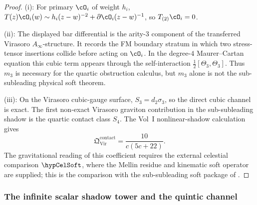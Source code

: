 \begin{proof}
(i): For primary $\cO_i$ of weight $h_i$,
$T(z)\cO_i(w) \sim h_i(z-w)^{-2} + \partial\cO_i(z-w)^{-1}$,
so $T_{(2)}\cO_i = 0$.

(ii): The displayed bar differential is the arity-$3$ component of
the transferred Virasoro \(A_\infty\)-structure.  It records the
FM boundary stratum in which two stress-tensor insertions collide
before acting on \(\cO_i\).  In the degree-$4$ Maurer--Cartan
equation this cubic term appears through the self-interaction
\(\frac12[\Theta_3,\Theta_3]\).  Thus \(m_3\) is necessary for the
quartic obstruction calculus, but \(m_3\) alone is not the
sub-subleading physical soft theorem.

(iii): On the Virasoro cubic-gauge surface,
\(S_3=d_2\sigma_3\), so the direct cubic channel is exact.  The first
non-exact Virasoro graviton contribution in the sub-subleading shadow
is the quartic contact class \(S_4\).  The Vol~I nonlinear-shadow
calculation gives
\[
\mathfrak Q^{\mathrm{contact}}_{\mathrm{Vir}}
=\frac{10}{c(5c+22)}.
\]
The gravitational reading of this coefficient requires the external
celestial comparison \(\hypCelSoft\), where the Mellin residue and
kinematic soft operator are supplied; this is the comparison with the
sub-subleading soft package of
\cite{CachazoStrominger14,HamadaShiuSubsubSoft}.
\end{proof}

\subsubsection*{The infinite scalar shadow tower and the quintic channel}

